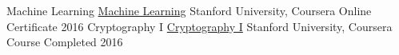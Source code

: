 \begin{cvhonors}
  \cvhonor
    {
    {Machine Learning}
    {\href{https://www.coursera.org/learn/machine-learning}{Machine Learning}}}
    {Stanford University, Coursera}
    {
    {Online Certificate}
    {\href{https://www.coursera.org/account/accomplishments/verify/ZWCUVR3HSXTM}{}}}
    {2016}
  \cvhonor
    {
    {Cryptography I}
    {\href{https://www.coursera.org/learn/crypto}{Cryptography I}}}
    {Stanford University, Coursera}
    {Course Completed}
    {2016}
\end{cvhonors}

